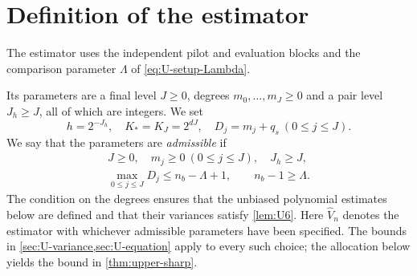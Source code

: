 \section{Definition of the estimator}\label{sec:U-estimator}

The estimator uses the independent pilot and evaluation blocks and the
comparison parameter $\Lambda$ of \eqref{eq:U-setup-Lambda}.

Its parameters are a final level $J\ge0$, degrees
$m_0,\dots,m_J\ge0$ and a pair level $J_h\ge J$, all of which are
integers. We set
\[
  h=2^{-J_h},\quad K_*=K_J=2^{dJ},\quad D_j=m_j+q_s\ (0\le j\le J).
\]
We say that the parameters are \emph{admissible} if
\begin{equation}\label{eq:Udef-admissible}
 \begin{gathered}
 J\ge0,\quad m_j\ge0\ (0\le j\le J),\quad J_h\ge J,\\
 \max_{0\le j\le J}D_j\le n_b-\Lambda+1,\qquad n_b-1\ge\Lambda.
 \end{gathered}
\end{equation}
The condition on the degrees ensures that the unbiased polynomial
estimates below are defined and that their variances satisfy
\cref{lem:U6}. Here $\widehat V_n$ denotes the estimator with whichever
admissible parameters have been specified. The bounds in
\cref{sec:U-variance,sec:U-equation} apply to every such choice;
the allocation below yields the bound in \cref{thm:upper-sharp}.

